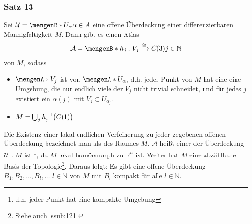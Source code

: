 \subsubsection[Satz 13: Differenzierbare Mannigfaltigkeiten sind parakompakt]{Satz 13} %
\label{ssub:311}
Sei $\mathcal{U} = \set[U_\alpha]{\alpha \in A}$ eine offene Überdeckung einer differenzierbaren Mannigfaltigkeit $M$. Dann gibt es einen Atlas 
\[
	\mathcal{A} = \set[h_j : V_j \xrightarrow{\cong} C(3)]{j \in \mathds{N}} 
\]
von $M$, sodass 
\begin{itemize}
	\item $\set{V_j}$ ist  von $\set{U_\alpha}$, d.h. jeder Punkt von $M$ hat eine eine Umgebung, die nur endlich viele der $V_j$
	nicht trivial schneidet, und für jedes $j$ existiert ein $\alpha(j)$ mit $V_j \subset U_{\alpha_j}$.
	\item $M = \bigcup_j h_j ^{-1}\enbrace[\big]{C(1)}$
\end{itemize}
Die Existenz einer lokal endlichen Verfeinerung zu jeder gegebenen offenen Überdeckung bezeichnet man als  des Raumes $M$. $\mathcal{A}$ heißt einer
der Überdeckung $\mathcal{U}$ .
$M$ ist \footnote{d.h. jeder Punkt hat eine kompakte Umgebung}, da $M$ lokal homöomorph zu $\mathds{R}^n$ ist. Weiter hat $M$ eine abzählbare Basis der 
Topologie\footnote{Siehe auch \ref{ssub:121}}. Daraus folgt: Es gibt eine offene Überdeckung 
$B_1, B_2,\ldots , B_l, \ldots $ $l\in\mathds{N}$ von $M$ mit $\overline{B}_l$ kompakt für alle $l\in \mathds{N}$.

